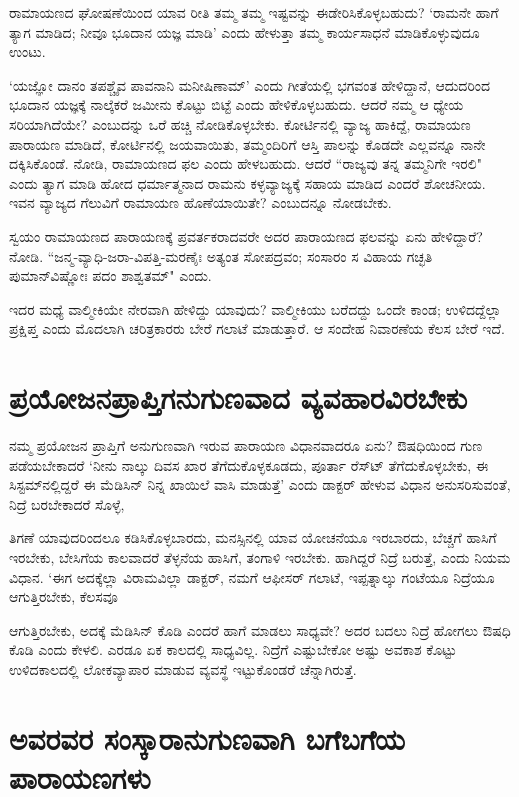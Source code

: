 ರಾಮಾಯಣದ ಘೋಷಣೆಯಿಂದ ಯಾವ ರೀತಿ ತಮ್ಮ ತಮ್ಮ ಇಷ್ಟವನ್ನು ಈಡೇರಿಸಿಕೊಳ್ಳಬಹುದು? `ರಾಮನೇ ಹಾಗೆ ತ್ಯಾಗ ಮಾಡಿದ; ನೀವೂ ಭೂದಾನ ಯಜ್ಞ ಮಾಡಿ' ಎಂದು ಹೇಳುತ್ತಾ ತಮ್ಮ ಕಾರ್ಯಸಾಧನೆ ಮಾಡಿಕೊಳ್ಳುವುದೂ ಉಂಟು. 


`ಯಜ್ಞೋ ದಾನಂ ತಪಶ್ಚೈವ ಪಾವನಾನಿ ಮನೀಷಿಣಾಮ್‍' ಎಂದು ಗೀತೆಯಲ್ಲಿ ಭಗವಂತ ಹೇಳಿದ್ದಾನೆ, ಆದುದರಿಂದ ಭೂದಾನ ಯಜ್ಞಕ್ಕೆ ನಾಲ್ಕೆಕರೆ ಜಮೀನು ಕೊಟ್ಟು ಬಿಟ್ಟೆ ಎಂದು ಹೇಳಿಕೊಳ್ಳಬಹುದು. ಆದರೆ ನಮ್ಮ ಆ ಧ್ಯೇಯ ಸರಿಯಾಗಿದೆಯೇ? ಎಂಬುದನ್ನು ಒರೆ ಹಚ್ಚಿ ನೋಡಿಕೊಳ್ಳಬೇಕು. ಕೋರ್ಟಿನಲ್ಲಿ ವ್ಯಾಜ್ಯ ಹಾಕಿದ್ದೆ, ರಾಮಾಯಣ ಪಾರಾಯಣ ಮಾಡಿದೆ, ಕೋರ್ಟಿನಲ್ಲಿ ಜಯವಾಯಿತು, ತಮ್ಮಂದಿರಿಗೆ ಆಸ್ತಿ ಪಾಲನ್ನು ಕೊಡದೇ ಎಲ್ಲವನ್ನೂ ನಾನೇ ದಕ್ಕಿಸಿಕೊಂಡೆ. ನೋಡಿ, ರಾಮಾಯಣದ ಫಲ ಎಂದು ಹೇಳಬಹುದು. ಆದರೆ ``ರಾಜ್ಯವು ತನ್ನ ತಮ್ಮನಿಗೇ ಇರಲಿ" ಎಂದು ತ್ಯಾಗ ಮಾಡಿ ಹೋದ ಧರ್ಮಾತ್ಮನಾದ ರಾಮನು ಕಳ್ಳವ್ಯಾಜ್ಯಕ್ಕೆ ಸಹಾಯ ಮಾಡಿದ ಎಂದರೆ ಶೋಚನೀಯ. ಇವನ ವ್ಯಾಜ್ಯದ ಗೆಲುವಿಗೆ ರಾಮಾಯಣ ಹೊಣೆಯಾಯಿತೇ? ಎಂಬುದನ್ನೂ ನೋಡಬೇಕು. 


ಸ್ವಯಂ ರಾಮಾಯಣದ ಪಾರಾಯಣಕ್ಕೆ ಪ್ರವರ್ತಕರಾದವರೇ ಅದರ ಪಾರಾಯಣದ ಫಲವನ್ನು ಏನು ಹೇಳಿದ್ದಾರೆ? ನೋಡಿ. ``ಜನ್ಮ-ವ್ಯಾಧಿ-ಜರಾ-ವಿಪತ್ತಿ-ಮರಣೈಃ ಅತ್ಯಂತ ಸೋಪದ್ರವಂ; ಸಂಸಾರಂ ಸ ವಿಹಾಯ ಗಚ್ಛತಿ ಪುಮಾನ್‍ವಿಷ್ಣೋಃ ಪದಂ ಶಾಶ್ವತಮ್‍" ಎಂದು. 


ಇದರ ಮಧ್ಯೆ ವಾಲ್ಮೀಕಿಯೇ ನೇರವಾಗಿ ಹೇಳಿದ್ದು ಯಾವುದು? ವಾಲ್ಮೀಕಿಯು ಬರೆದದ್ದು ಒಂದೇ ಕಾಂಡ; ಉಳಿದದ್ದೆಲ್ಲಾ ಪ್ರಕ್ಷಿಪ್ತ ಎಂದು ಮೊದಲಾಗಿ ಚರಿತ್ರಕಾರರು ಬೇರೆ ಗಲಾಟೆ ಮಾಡುತ್ತಾರೆ. ಆ ಸಂದೇಹ ನಿವಾರಣೆಯ ಕೆಲಸ ಬೇರೆ ಇದೆ. 


\section*{ಪ್ರಯೋಜನಪ್ರಾಪ್ತಿಗನುಗುಣವಾದ ವ್ಯವಹಾರವಿರಬೇಕು} 


ನಮ್ಮ ಪ್ರಯೋಜನ ಪ್ರಾಪ್ತಿಗೆ ಅನುಗುಣವಾಗಿ ಇರುವ ಪಾರಾಯಣ ವಿಧಾನವಾದರೂ ಏನು? ಔಷಧಿಯಿಂದ ಗುಣ ಪಡೆಯಬೇಕಾದರೆ `ನೀನು ನಾಲ್ಕು ದಿವಸ ಖಾರ ತೆಗೆದುಕೊಳ್ಳಕೂಡದು, ಪೂರ್ತಾ ರೆಸ್ಟ್‍ ತೆಗೆದುಕೊಳ್ಳಬೇಕು, ಈ ಸಿಸ್ಟಮ್‍ನಲ್ಲಿದ್ದರೆ ಈ ಮೆಡಿಸಿನ್‍ ನಿನ್ನ ಖಾಯಿಲೆ ವಾಸಿ ಮಾಡುತ್ತೆ' ಎಂದು ಡಾಕ್ಟರ್‍ ಹೇಳುವ ವಿಧಾನ ಅನುಸರಿಸುವಂತೆ, ನಿದ್ರೆ ಬರಬೇಕಾದರೆ ಸೊಳ್ಳೆ, 

ತಿಗಣೆ ಯಾವುದರಿಂದಲೂ ಕಡಿಸಿಕೊಳ್ಳಬಾರದು, ಮನಸ್ಸಿನಲ್ಲಿ ಯಾವ ಯೋಚನೆಯೂ ಇರಬಾರದು, ಬೆಚ್ಚಗೆ ಹಾಸಿಗೆ ಇರಬೇಕು, ಬೇಸಿಗೆಯ ಕಾಲವಾದರೆ ತೆಳ್ಳನೆಯ ಹಾಸಿಗೆ, ತಂಗಾಳಿ ಇರಬೇಕು. ಹಾಗಿದ್ದರೆ ನಿದ್ರೆ ಬರುತ್ತೆ, ಎಂದು ನಿಯಮ ವಿಧಾನ. `ಈಗ ಅದಕ್ಕೆಲ್ಲಾ ವಿರಾಮವಿಲ್ಲಾ ಡಾಕ್ಟರ್‍, ನಮಗೆ ಆಫೀಸರ್‍ ಗಲಾಟೆ, ಇಪ್ಪತ್ನಾಲ್ಕು ಗಂಟೆಯೂ ನಿದ್ರೆಯೂ ಆಗುತ್ತಿರಬೇಕು, ಕೆಲಸವೂ 

ಆಗುತ್ತಿರಬೇಕು, ಅದಕ್ಕೆ ಮೆಡಿಸಿನ್‍ ಕೊಡಿ ಎಂದರೆ ಹಾಗೆ ಮಾಡಲು ಸಾಧ್ಯವೇ? ಅದರ ಬದಲು ನಿದ್ರೆ ಹೋಗಲು ಔಷಧಿ ಕೊಡಿ ಎಂದು ಕೇಳಲಿ. ಎರಡೂ ಏಕ ಕಾಲದಲ್ಲಿ ಸಾಧ್ಯವಿಲ್ಲ. ನಿದ್ರೆಗೆ ಎಷ್ಟುಬೇಕೋ ಅಷ್ಟು ಅವಕಾಶ ಕೊಟ್ಟು ಉಳಿದಕಾಲದಲ್ಲಿ ಲೋಕವ್ಯಾಪಾರ ಮಾಡುವ ವ್ಯವಸ್ಥೆ ಇಟ್ಟುಕೊಂಡರೆ ಚೆನ್ನಾಗಿರುತ್ತೆ. 


\section*{ಅವರವರ ಸಂಸ್ಕಾರಾನುಗುಣವಾಗಿ ಬಗೆಬಗೆಯ ಪಾರಾಯಣಗಳು} 


